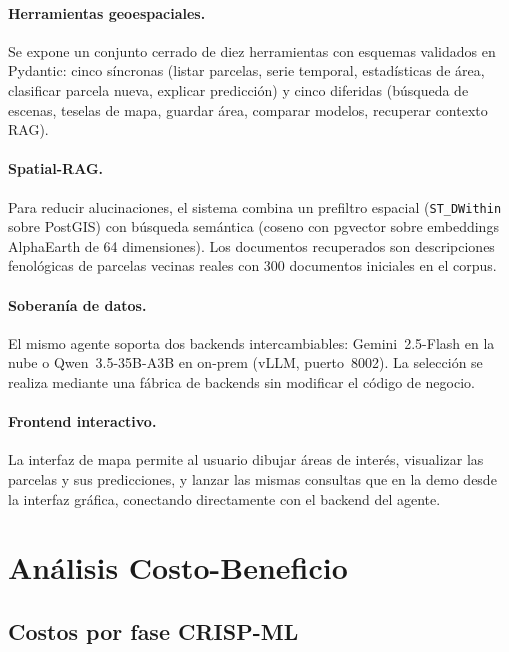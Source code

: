 \documentclass{article}
\begin{document}
\paragraph{Herramientas geoespaciales.}
Se expone un conjunto cerrado de diez herramientas con esquemas validados
en Pydantic: cinco síncronas (listar parcelas, serie temporal, estadísticas
de área, clasificar parcela nueva, explicar predicción) y cinco diferidas
(búsqueda de escenas, teselas de mapa, guardar área, comparar modelos,
recuperar contexto RAG).

\paragraph{Spatial-RAG.}
Para reducir alucinaciones, el sistema combina un prefiltro espacial
(\texttt{ST\_DWithin} sobre PostGIS) con búsqueda semántica (coseno con
pgvector sobre embeddings AlphaEarth de 64 dimensiones). Los documentos
recuperados son descripciones fenológicas de parcelas vecinas reales
con 300 documentos iniciales en el corpus.

\paragraph{Soberanía de datos.}
El mismo agente soporta dos backends intercambiables: Gemini~2.5-Flash en
la nube o Qwen~3.5-35B-A3B en on-prem (vLLM, puerto~8002). La selección
se realiza mediante una fábrica de backends sin modificar el código de
negocio.

\paragraph{Frontend interactivo.}
La interfaz de mapa permite al usuario dibujar áreas de interés, visualizar
las parcelas y sus predicciones, y lanzar las mismas consultas que en la
demo desde la interfaz gráfica, conectando directamente con el backend del
agente.

\section{Análisis Costo-Beneficio}

\subsection{Costos por fase CRISP-ML}
\end{document}

